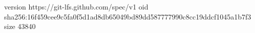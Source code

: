 version https://git-lfs.github.com/spec/v1
oid sha256:16f459cee9c5fa0f5d1ad8db65049bd89dd587777990c8cc19ddcf1045a1b7f3
size 43840
